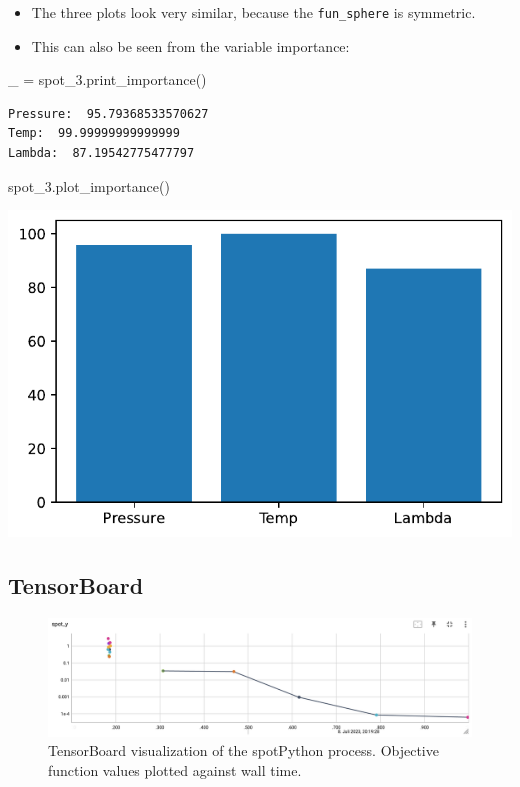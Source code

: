 \documentclass[
  letterpaper,
  DIV=11,
  numbers=noendperiod]{scrreprt}
\newenvironment{Shaded}{\begin{snugshade}}{\end{snugshade}}
\newcommand{\NormalTok}[1]{\textcolor[rgb]{0.00,0.23,0.31}{#1}}
\newcommand{\OperatorTok}[1]{\textcolor[rgb]{0.37,0.37,0.37}{#1}}
\providecommand{\tightlist}{%
  \setlength{\itemsep}{0pt}\setlength{\parskip}{0pt}}\usepackage{longtable,booktabs,array}
\begin{document}
\begin{itemize}
\tightlist
\item
  The three plots look very similar, because the \texttt{fun\_sphere} is
  symmetric.
\item
  This can also be seen from the variable importance:
\end{itemize}

\begin{Shaded}
\begin{Highlighting}[]
\NormalTok{\_ }\OperatorTok{=}\NormalTok{ spot\_3.print\_importance()}
\end{Highlighting}
\end{Shaded}

\begin{verbatim}
Pressure:  95.79368533570627
Temp:  99.99999999999999
Lambda:  87.19542775477797
\end{verbatim}

\begin{Shaded}
\begin{Highlighting}[]
\NormalTok{spot\_3.plot\_importance()}
\end{Highlighting}
\end{Shaded}

\includegraphics{008_num_spot_multidim_files/figure-pdf/cell-11-output-1.pdf}

\subsection{TensorBoard}\label{tensorboard-2}

\begin{figure}[H]

{\centering \includegraphics{figures_static/02_tensorboard_01.png}

}

\caption{TensorBoard visualization of the spotPython process. Objective
function values plotted against wall time.}

\end{figure}%
\end{document}
